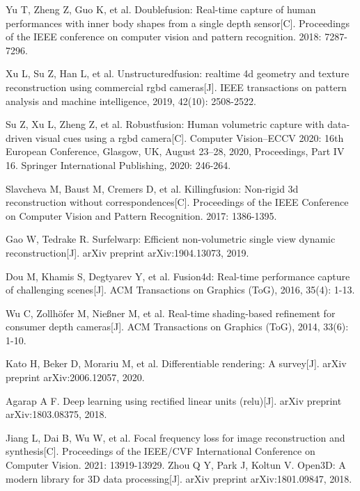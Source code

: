 Yu T, Zheng Z, Guo K, et al. Doublefusion: Real-time capture of human performances with inner body shapes from a single depth sensor[C]. Proceedings of the IEEE conference on computer vision and pattern recognition. 2018: 7287-7296.

Xu L, Su Z, Han L, et al. Unstructuredfusion: realtime 4d geometry and texture reconstruction using commercial rgbd cameras[J]. IEEE transactions on pattern analysis and machine intelligence, 2019, 42(10): 2508-2522.

 Su Z, Xu L, Zheng Z, et al. Robustfusion: Human volumetric capture with data-driven visual cues using a rgbd camera[C]. Computer Vision–ECCV 2020: 16th European Conference, Glasgow, UK, August 23–28, 2020, Proceedings, Part IV 16. Springer International Publishing, 2020: 246-264.


Slavcheva M, Baust M, Cremers D, et al. Killingfusion: Non-rigid 3d reconstruction without correspondences[C]. Proceedings of the IEEE Conference on Computer Vision and Pattern Recognition. 2017: 1386-1395.

Gao W, Tedrake R. Surfelwarp: Efficient non-volumetric single view dynamic reconstruction[J]. arXiv preprint arXiv:1904.13073, 2019.

Dou M, Khamis S, Degtyarev Y, et al. Fusion4d: Real-time performance capture of challenging scenes[J]. ACM Transactions on Graphics (ToG), 2016, 35(4): 1-13.

Wu C, Zollhöfer M, Nießner M, et al. Real-time shading-based refinement for consumer depth cameras[J]. ACM Transactions on Graphics (ToG), 2014, 33(6): 1-10.

Kato H, Beker D, Morariu M, et al. Differentiable rendering: A survey[J]. arXiv preprint arXiv:2006.12057, 2020.

Agarap A F. Deep learning using rectified linear units (relu)[J]. arXiv preprint arXiv:1803.08375, 2018.

Jiang L, Dai B, Wu W, et al. Focal frequency loss for image reconstruction and synthesis[C]. Proceedings of the IEEE/CVF International Conference on Computer Vision. 2021: 13919-13929.
Zhou Q Y, Park J, Koltun V. Open3D: A modern library for 3D data processing[J]. arXiv preprint arXiv:1801.09847, 2018.





